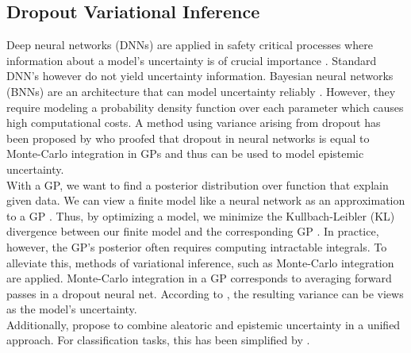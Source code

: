 \documentclass[a4paper,cleardoubleempty,BCOR1cm, 11pt]{report}
\begin{document}
\subsection{Dropout Variational Inference} %
Deep neural networks (DNNs) are applied in safety critical processes where information about a model's uncertainty is of crucial importance \cite{najafabadi2015deep,krzywinski2013importance}. Standard DNN's however do not yield uncertainty information. Bayesian neural networks (BNNs) are an architecture that can model uncertainty reliably \cite{mullachery2018bayesian}. However, they require modeling a probability density function over each parameter which causes high computational costs. A method using variance arising from dropout has been proposed by \citet{gal2016dropout} who proofed that dropout in neural networks is equal to Monte-Carlo integration in GPs and thus can be used to model epistemic uncertainty.\\
With a GP, we want to find a posterior distribution over function that explain given data. We can view a finite model like a neural network as an approximation to a GP \cite{damianou2013deep}. Thus, by optimizing a model, we minimize the Kullbach-Leibler (KL) divergence between our finite model and the corresponding GP \cite{gal2016dropout}. In practice, however, the GP's posterior often requires computing intractable integrals. To alleviate this, methods of variational inference, such as Monte-Carlo integration are applied. Monte-Carlo integration in a GP corresponds to averaging forward passes in a dropout neural net. According to \citet{gal2016dropout}, the resulting variance can be views as the model's uncertainty.
\\
Additionally, \citet{kendall2017uncertainties} propose to combine aleatoric and epistemic uncertainty in a unified approach. For classification tasks, this has been simplified by \citet{kwon2020uncertainty}.
\end{document}
